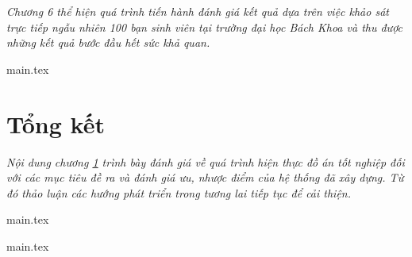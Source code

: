 \documentclass[a4paper, 12pt]{report}
\begin{document}
\textit{Chương 6 thể hiện quá trình tiến hành đánh giá kết quả dựa trên việc khảo sát trực tiếp ngẫu nhiên 100 bạn sinh viên tại trường đại học Bách Khoa và thu được những kết quả bước đầu hết sức khả quan.}

{main.tex}

\chapter{Tổng kết} \label{chap:summary}
\thispagestyle{fancy} %

\textit{Nội dung chương \ref{chap:summary} trình bày đánh giá về quá trình hiện thực đồ án tốt nghiệp đối với các mục tiêu đề ra và đánh giá ưu, nhược điểm của hệ thống đã xây dựng. Từ đó thảo luận các hướng phát triển trong tương lai tiếp tục để cải thiện.}

{main.tex}

\newpage
\pagestyle{empty}

{main.tex}

\end{document}
